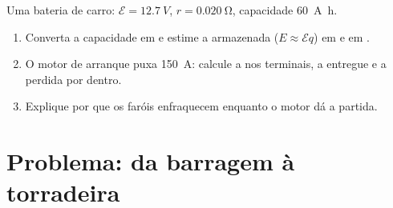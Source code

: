 \begin{exercise}[$\star\star\star$]\label{exo:g11:circuits-and-power:15}
Uma bateria de carro: $\mathcal{E} = \qty{12.7}{V}$,
$r = \qty{0.020}{\ohm}$, capacidade \qty{60}{A.h}.
\begin{enumerate}
  \item Converta a capacidade em  e estime a  armazenada
        ($E \approx \mathcal{E} q$) em  e em .
  \item O motor de arranque puxa \qty{150}{A}: calcule a  nos
        terminais, a  entregue e a  perdida por dentro.
  \item Explique por que os faróis enfraquecem enquanto o motor dá a
        partida.
\end{enumerate}
\end{exercise}

\section{Problema: da barragem à torradeira}

